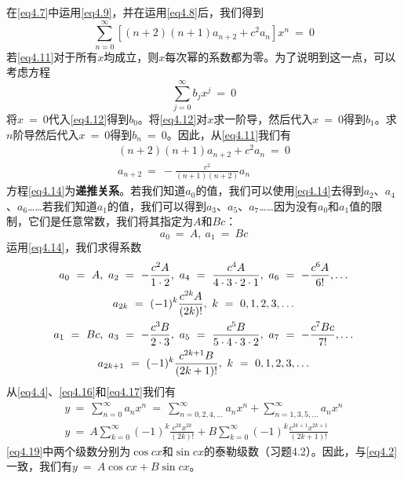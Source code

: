 \documentclass[12pt,a4paper,openany]{ctexbook}
\begin{document}
\begin{flushleft}
在\eqref{eq4.7}中运用\eqref{eq4.9}，并在运用\eqref{eq4.8}后，我们得到
\begin{equation}
    \sum_{n=0}^\infty [(n+2)(n+1)a_{n+2}+c^2a_n]x^n\ =\ 0 \label{eq4.11}
\end{equation}
若\eqref{eq4.11}对于所有$x$均成立，则$x$每次幂的系数都为零。为了说明到这一点，可以考虑方程
\begin{equation}
    \sum_{j=0}^\infty b_jx^j\ =\ 0 \label{eq4.12}
\end{equation}
将$x\ =\ 0$代入\eqref{eq4.12}得到$b_0$。将\eqref{eq4.12}对$x$求一阶导，然后代入$x\ =\ 0$得到$b_1$。求$n$阶导然后代入$x\ =\ 0$得到$b_n\ =\ 0$。因此，从\eqref{eq4.11}我们有
\begin{gather}
    (n+2)(n+1)a_{n+2}+c^2a_n\ =\ 0 \label{eq4.13} \\
    a_{n+2}\ =\ -\frac{c^2}{(n+1)(n+2)}a_n \label{eq4.14}
\end{gather}
方程\eqref{eq4.14}为\textbf{递推关系}。若我们知道$a_0$的值，我们可以使用\eqref{eq4.14}去得到$a_2$、$a_4$、$a_6$……若我们知道$a_1$的值，我们可以得到$a_3$、$a_5$、$a_7$……因为没有$a_0$和$a_1$值的限制，它们是任意常数，我们将其指定为$A$和$Bc$：
\begin{equation}
    a_0\ =\ A,\ a_1\ =\ Bc \label{eq4.15}
\end{equation}
运用\eqref{eq4.14}，我们求得系数
\begin{gather}
    a_0\ =\ A,\ a_2\ =\ -\frac{c^2A}{1\cdot 2},\ a_4\ =\ \frac{c^4A}{4\cdot 3\cdot 2 \cdot 1},\ a_6\ =\ -\frac{c^6A}{6!},\dots \notag \\
    a_{2k}\ =\ (-1)^k\frac{c^{2k}A}{(2k)!},\ k\ =\ 0,1,2,3,\dots \label{eq4.16} \\
    a_1\ =\ Bc,\ a_3\ =\ -\frac{c^3B}{2\cdot 3},\ a_5\ =\ \frac{c^5B}{5\cdot 4\cdot 3\cdot 2},\ a_7\ =\ -\frac{c^7Bc}{7!},\dots \notag \\
    a_{2k+1}\ =\ (-1)^k\frac{c^{2k+1}B}{(2k+1)!},\ k\ =\ 0,1,2,3,\dots \label{eq4.17} 
\end{gather}
从\eqref{eq4.4}、\eqref{eq4.16}和\eqref{eq4.17}我们有
\begin{gather}
    y\ =\ \sum_{n=0}^\infty a_nx^n\ =\ \sum_{n=0,2,4,\dots}^\infty a_nx^n+\sum_{n=1,3,5,\dots}^\infty a_nx^n \label{eq4.18} \\
    y\ =\ A\sum_{k=0}^\infty (-1)^k\frac{c^{2k}x^{2k}}{(2k)!}+B\sum_{k=0}^\infty (-1)^k\frac{c^{2k+1}x^{2k+1}}{(2k+1)!} \label{eq4.19}
\end{gather}
\eqref{eq4.19}中两个级数分别为$\cos cx$和$\sin cx$的泰勒级数（习题4.2）。因此，与\eqref{eq4.2}一致，我们有$y\ =\ A\cos cx+B\sin cx$。
\end{flushleft}
\end{document}
